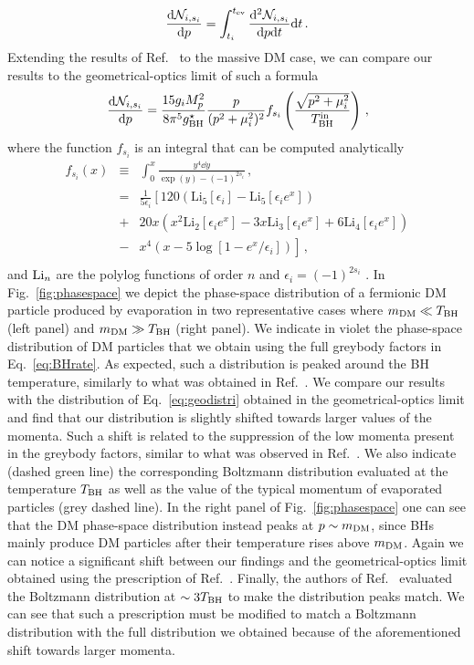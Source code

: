 \documentclass[aps,prd,reprint,twocolumn,preprintnumbers,floatfix,nofootinbib]{revtex4-1}
\newcommand{\be}{\begin{equation}}
\newcommand{\ee}{\end{equation}}
\newcommand{\bea}{\begin{eqnarray}}
\newcommand{\eea}{\end{eqnarray}}
\newcommand{\mDM}{m_{\rm DM}}
\newcommand{\TBH}{T_{\rm BH}}
\newcommand{\TBHi}{T_{\rm BH}^{\rm in}}
\begin{document}
\be
\frac{\dd \mathcal N_{i,s_i}}{\dd p}=\int_{t_i}^{t_{\rm ev}}\frac{\dd^2 \mathcal{N}_{i, s_i}}{\dd p\dd t}\dd t\,.
\ee
Extending the results of Ref.~\cite{Baldes:2020nuv} to the massive DM case, we can compare our results to the geometrical-optics limit of such a formula 
\be\label{eq:geodistri}
\frac{\dd \mathcal N_{i,s_i}}{\dd p}=\frac{15 g_i M_p^2}{8\pi^5 g^\star_{\rm BH}}\frac{p}{(p^2+\mu_i^2)^2}f_{s_i}\left(\frac{\sqrt{p^2+\mu_i^2}}{\TBHi}\right)\,,
\ee
where the function $f_{s_i}$ is an integral that can be computed analytically
\bea
f_{s_i}(x) &\equiv& \int_0^x\frac{y^4\dd y}{\exp(y)-(-1)^{2s_i}}\,,\nonumber\\
&=&\frac{1}{5 \epsilon_i} \left[120 \left( \text{Li}_5\left[\epsilon_i\right]-\text{Li}_5\left[\epsilon_i e^x\right]\right)\right.\nonumber\\
&+&\left.20 x \left(x^2 \text{Li}_2\left[\epsilon_i e^x\right]-3 x \text{Li}_3\left[\epsilon_i e^x\right]+6 \text{Li}_4\left[\epsilon_i e^x\right]\right)\right.\nonumber\\
&-&\left.x^4 \left(x-5 \log \left[1- e^x/\epsilon_i \right]\right)\right]\,,\nonumber\\
\eea
and ${\rm Li}_n$ are the polylog functions of order $n$ and $\epsilon_i=(-1)^{2 s_i}$ . In Fig.~\ref{fig:phasespace} we depict the phase-space distribution of a fermionic DM particle produced by evaporation in two representative cases where $\mDM \ll \TBH$ (left panel) and $\mDM\gg \TBH$ (right panel). We indicate in violet the phase-space distribution of DM particles that we obtain using the full greybody factors in Eq.~\eqref{eq:BHrate}. As expected, such a distribution is peaked around the BH temperature, similarly to what was obtained in Ref.~\cite{Baldes:2020nuv}. We compare our results with the distribution of Eq.~\eqref{eq:geodistri} obtained in the geometrical-optics limit and find that our distribution is slightly shifted towards larger values of the momenta.
Such a shift is related to the suppression of the low momenta present in the greybody factors,
similar to what was observed in Ref.~\cite{Auffinger:2020afu}.
We also indicate (dashed green line) the corresponding Boltzmann distribution evaluated at the temperature $\TBH$ as well as the value of the typical momentum of evaporated particles (grey dashed line). In the right panel of Fig.~\ref{fig:phasespace} one can see that the DM phase-space distribution instead peaks at $p\sim \mDM$, since BHs mainly produce DM particles after their temperature rises above $\mDM$. Again we can notice a significant shift between our findings and the geometrical-optics limit obtained using the prescription of Ref.~\cite{Baldes:2020nuv}. Finally, the authors of Ref.~\cite{Baldes:2020nuv} evaluated the Boltzmann distribution at $\sim 3 \TBH$ to make the distribution peaks match. We can see that such a prescription must be modified to match a Boltzmann distribution with the full distribution we obtained because of the aforementioned shift towards larger momenta. 
\end{document}
